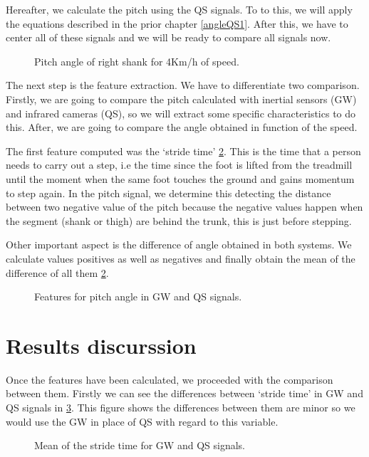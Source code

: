Hereafter, we calculate the pitch using the QS signals. To to this, we will apply the equations described in the prior chapter \ref{angleQS1}.
After this, we have to center all of these signals and we will be ready to compare all signals now.

\begin{figure}[H]
	\centering
	\caption{Pitch angle of right shank for 4Km/h of speed.}
	\label{fig:signalGWQS}
\end{figure}

The next step is the feature extraction. We have to differentiate two comparison. Firstly, we are going to compare the pitch calculated with inertial sensors (GW) and infrared cameras (QS), so we will extract some specific characteristics to do this. After, we are going to compare the angle obtained in function of the speed.

The first feature computed was the ‘stride time’ \ref{fig:featuresGWQS}. This is the time that a person needs to carry out a step, i.e the time since the foot is lifted from the treadmill until the moment when the same foot touches the ground and gains momentum to step again. In the pitch signal, we determine this detecting the distance between two negative value of the pitch because the negative values happen when the segment (shank or thigh) are behind the trunk, this is just before stepping.

Other important aspect is the difference of angle obtained in both systems. We calculate values positives as well as negatives and finally obtain the mean of the difference of all them \ref{fig:featuresGWQS}.
\begin{figure}[H]
	\centering
	\caption{Features for pitch angle in GW and QS signals.}
	\label{fig:featuresGWQS}
\end{figure}

\section{Results discurssion}
Once the features have been calculated, we proceeded with the comparison between them. Firstly we can see the differences between ‘stride time’ in GW and QS signals in \ref{fig:mean_stride_time}. This figure shows the differences between them are minor so we would use the GW in place of QS with regard to this variable.

\begin{figure}[H]
	\centering
	\caption{Mean of the stride time for GW and QS signals.}
	\label{fig:mean_stride_time}
\end{figure}

